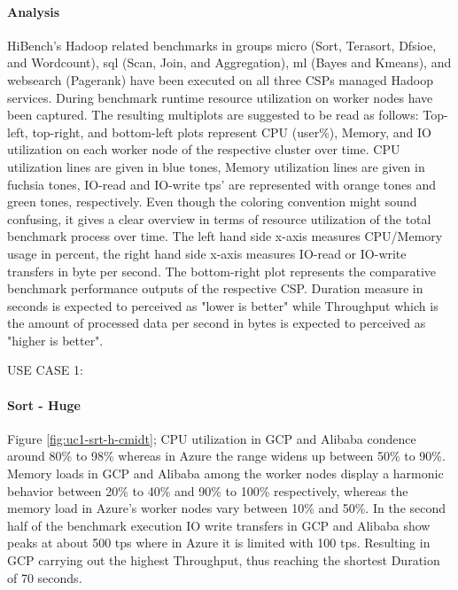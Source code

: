 \documentclass[review]{elsarticle}
\begin{document}
\paragraph{Analysis}HiBench's Hadoop related benchmarks in groups micro (Sort, Terasort, Dfsioe, and Wordcount), sql (Scan, Join, and Aggregation), ml (Bayes and Kmeans), and websearch (Pagerank) have been executed on all three CSPs managed Hadoop services. During benchmark runtime resource utilization on worker nodes have been captured. The resulting multiplots are suggested to be read as follows: Top-left, top-right, and bottom-left plots represent CPU (user\%), Memory, and IO utilization on each worker node of the respective cluster over time. CPU utilization lines are given in blue tones, Memory utilization lines are given in fuchsia tones, IO-read and IO-write tps' are represented with orange tones and green tones, respectively. Even though the coloring convention might sound confusing, it gives a clear overview in terms of resource utilization of the total benchmark process over time. The left hand side x-axis measures CPU/Memory usage in percent, the right hand side x-axis measures IO-read or IO-write transfers in byte per second. The bottom-right plot represents the comparative benchmark performance outputs of the respective CSP. Duration measure in seconds is expected to perceived as "lower is better" while Throughput which is the amount of processed data per second in bytes is expected to perceived as "higher is better".





USE CASE 1: 

\paragraph{Sort - Huge} Figure \ref{fig:uc1-srt-h-cmidt}; CPU utilization in GCP and Alibaba condence around 80\% to 98\% whereas in Azure the range widens up between 50\% to 90\%. Memory loads in GCP and Alibaba among the worker nodes display a harmonic behavior between 20\% to 40\% and 90\% to 100\% respectively, whereas the memory load in Azure's worker nodes vary between 10\% and 50\%. In the second half of the benchmark execution IO write transfers in GCP and Alibaba show peaks at about 500 tps where in Azure it is limited with 100 tps. Resulting in GCP carrying out the highest Throughput, thus reaching the shortest Duration of 70 seconds.
\end{document}
